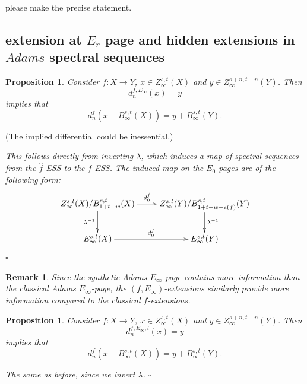 \documentclass[12pt,a4paper]{article}
\renewenvironment{proof}{{\noindent\it\textbf{Proof}}\quad\it}{\hfill$\square$}
\newtheorem{remark}[equation]{Remark}
\newtheorem{proposition}[equation]{Proposition}
\begin{document}
\begin{sloppy}
please make the precise statement.

\subsection{extension at $E_r$ page and hidden extensions in $Adams$ spectral sequences}
\begin{proposition}
    Consider $f: X\to Y$, $x\in Z_\infty^{s,t}(X)$ and $y\in Z_\infty^{s+n,t+n}(Y)$.
    Then
    $$d^{f,E_\infty}_n(x)=y$$
    implies that
    $$d^{f}_n(x+B_\infty^{s,t}(X))=y+B_\infty^{s,t}(Y).$$
\end{proposition}
(The implied differential could be inessential.)

\begin{proof}
  This follows directly from inverting $\lambda$, which induces a map of spectral sequences from the $\hat f$-ESS to the $f$-ESS. The induced map on the $E_0$-pages are of the following form:
    $$\xymatrix{
    Z_\infty^{s,t}(X)/B_{1+t-w}^{s,t}(X)\ar[r]^-{d^{\hat f}_0}\ar[d]_{\lambda^{-1}} & Z_\infty^{s,t}(Y)/B_{1+t-w-e(f)}^{s,t}(Y)\ar[d]^{\lambda^{-1}}\\
    E_\infty^{s,t}(X)\ar[r]^-{d^{f}_0} & E_\infty^{s, t}(Y)
    }$$
\end{proof}
\begin{remark}
    Since the synthetic Adams $E_\infty$-page contains more information than the classical Adams $E_\infty$-page, the $(f,E_\infty)$-extensions similarly provide more information compared to the classical $f$-extensions.
\end{remark}

\begin{proposition}
    Consider $f: X\to Y$, $x\in Z_\infty^{s,t}(X)$ and $y\in Z_\infty^{s+n,t+n}(Y)$.
    Then
    $$d^{f,E_\infty, l}_n(x)=y$$
    implies that
    $$d^{f}_n(x+B_\infty^{s,t}(X))=y+B_\infty^{s,t}(Y).$$
\end{proposition}
\begin{proof}
    The same as before, since we invert $\lambda$.
\end{proof}

\end{sloppy}
\end{document}

